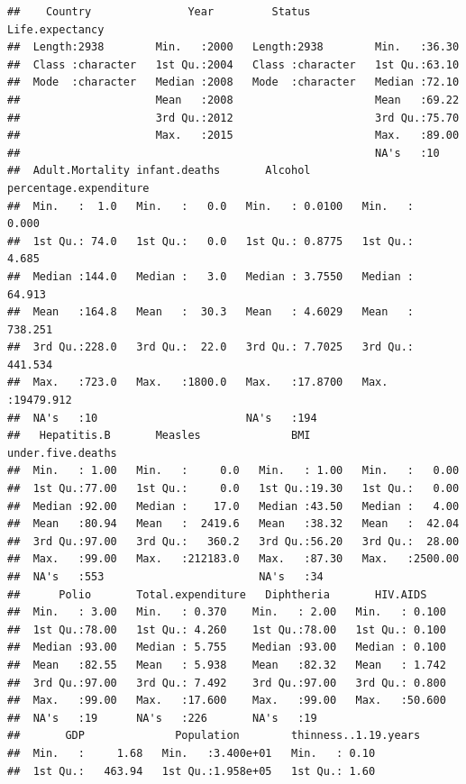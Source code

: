 \documentclass[
]{article}
\begin{document}
\begin{verbatim}
##    Country               Year         Status          Life.expectancy
##  Length:2938        Min.   :2000   Length:2938        Min.   :36.30  
##  Class :character   1st Qu.:2004   Class :character   1st Qu.:63.10  
##  Mode  :character   Median :2008   Mode  :character   Median :72.10  
##                     Mean   :2008                      Mean   :69.22  
##                     3rd Qu.:2012                      3rd Qu.:75.70  
##                     Max.   :2015                      Max.   :89.00  
##                                                       NA's   :10     
##  Adult.Mortality infant.deaths       Alcohol        percentage.expenditure
##  Min.   :  1.0   Min.   :   0.0   Min.   : 0.0100   Min.   :    0.000     
##  1st Qu.: 74.0   1st Qu.:   0.0   1st Qu.: 0.8775   1st Qu.:    4.685     
##  Median :144.0   Median :   3.0   Median : 3.7550   Median :   64.913     
##  Mean   :164.8   Mean   :  30.3   Mean   : 4.6029   Mean   :  738.251     
##  3rd Qu.:228.0   3rd Qu.:  22.0   3rd Qu.: 7.7025   3rd Qu.:  441.534     
##  Max.   :723.0   Max.   :1800.0   Max.   :17.8700   Max.   :19479.912     
##  NA's   :10                       NA's   :194                             
##   Hepatitis.B       Measles              BMI        under.five.deaths
##  Min.   : 1.00   Min.   :     0.0   Min.   : 1.00   Min.   :   0.00  
##  1st Qu.:77.00   1st Qu.:     0.0   1st Qu.:19.30   1st Qu.:   0.00  
##  Median :92.00   Median :    17.0   Median :43.50   Median :   4.00  
##  Mean   :80.94   Mean   :  2419.6   Mean   :38.32   Mean   :  42.04  
##  3rd Qu.:97.00   3rd Qu.:   360.2   3rd Qu.:56.20   3rd Qu.:  28.00  
##  Max.   :99.00   Max.   :212183.0   Max.   :87.30   Max.   :2500.00  
##  NA's   :553                        NA's   :34                       
##      Polio       Total.expenditure   Diphtheria       HIV.AIDS     
##  Min.   : 3.00   Min.   : 0.370    Min.   : 2.00   Min.   : 0.100  
##  1st Qu.:78.00   1st Qu.: 4.260    1st Qu.:78.00   1st Qu.: 0.100  
##  Median :93.00   Median : 5.755    Median :93.00   Median : 0.100  
##  Mean   :82.55   Mean   : 5.938    Mean   :82.32   Mean   : 1.742  
##  3rd Qu.:97.00   3rd Qu.: 7.492    3rd Qu.:97.00   3rd Qu.: 0.800  
##  Max.   :99.00   Max.   :17.600    Max.   :99.00   Max.   :50.600  
##  NA's   :19      NA's   :226       NA's   :19                      
##       GDP              Population        thinness..1.19.years
##  Min.   :     1.68   Min.   :3.400e+01   Min.   : 0.10       
##  1st Qu.:   463.94   1st Qu.:1.958e+05   1st Qu.: 1.60       

\end{verbatim}
\end{document}
